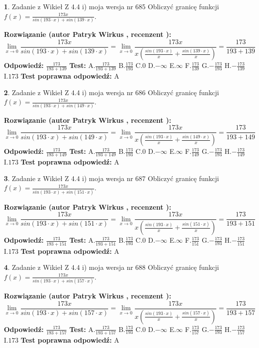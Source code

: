 \documentclass[12pt, a4paper]{article}
\theoremstyle{definition} %
\newtheorem{zad}{}
\newcommand{\zadStart}[1]{\begin{zad}#1\newline}
\newcommand{\zadStop}{\end{zad}}
\newcommand{\rozwStart}[2]{\noindent \textbf{Rozwiązanie (autor #1 , recenzent #2): }\newline}
\newcommand{\rozwStop}{\newline}
\newcommand{\odpStart}{\noindent \textbf{Odpowiedź:}\newline}
\newcommand{\odpStop}{\newline}
\newcommand{\testStart}{\noindent \textbf{Test:}\newline}
\newcommand{\testStop}{\newline}
\newcommand{\kluczStart}{\noindent \textbf{Test poprawna odpowiedź:}\newline}
\newcommand{\kluczStop}{\newline}
\begin{document}
\zadStart{Zadanie z Wikieł Z 4.4 i) moja wersja nr 685}
Obliczyć granicę funkcji $f(x)=\frac{173x}{sin(193\cdot x) +sin(139\cdot x)}$.
\zadStop
\rozwStart{Patryk Wirkus}{}
$$\lim\limits_{x\to 0}\frac{173x}{sin(193\cdot x) +sin(139\cdot x)}=\lim\limits_{x\to 0}\frac{173x}{x(\frac{sin(193\cdot x)}{x}+\frac{sin(139\cdot x)}{x})}=\frac{173}{193+139}$$
\rozwStop
\odpStart
$\frac{173}{193+139}$
\odpStop
\testStart
A.$\frac{173}{193+139}$
B.$\frac{173}{193}$
C.$0$
D.$-\infty$
E.$\infty$
F.$\frac{173}{139}$
G.$-\frac{173}{193}$
H.$-\frac{173}{139}$
I.$173$
\testStop
\kluczStart
A
\kluczStop



\zadStart{Zadanie z Wikieł Z 4.4 i) moja wersja nr 686}
Obliczyć granicę funkcji $f(x)=\frac{173x}{sin(193\cdot x) +sin(149\cdot x)}$.
\zadStop
\rozwStart{Patryk Wirkus}{}
$$\lim\limits_{x\to 0}\frac{173x}{sin(193\cdot x) +sin(149\cdot x)}=\lim\limits_{x\to 0}\frac{173x}{x(\frac{sin(193\cdot x)}{x}+\frac{sin(149\cdot x)}{x})}=\frac{173}{193+149}$$
\rozwStop
\odpStart
$\frac{173}{193+149}$
\odpStop
\testStart
A.$\frac{173}{193+149}$
B.$\frac{173}{193}$
C.$0$
D.$-\infty$
E.$\infty$
F.$\frac{173}{149}$
G.$-\frac{173}{193}$
H.$-\frac{173}{149}$
I.$173$
\testStop
\kluczStart
A
\kluczStop



\zadStart{Zadanie z Wikieł Z 4.4 i) moja wersja nr 687}
Obliczyć granicę funkcji $f(x)=\frac{173x}{sin(193\cdot x) +sin(151\cdot x)}$.
\zadStop
\rozwStart{Patryk Wirkus}{}
$$\lim\limits_{x\to 0}\frac{173x}{sin(193\cdot x) +sin(151\cdot x)}=\lim\limits_{x\to 0}\frac{173x}{x(\frac{sin(193\cdot x)}{x}+\frac{sin(151\cdot x)}{x})}=\frac{173}{193+151}$$
\rozwStop
\odpStart
$\frac{173}{193+151}$
\odpStop
\testStart
A.$\frac{173}{193+151}$
B.$\frac{173}{193}$
C.$0$
D.$-\infty$
E.$\infty$
F.$\frac{173}{151}$
G.$-\frac{173}{193}$
H.$-\frac{173}{151}$
I.$173$
\testStop
\kluczStart
A
\kluczStop



\zadStart{Zadanie z Wikieł Z 4.4 i) moja wersja nr 688}
Obliczyć granicę funkcji $f(x)=\frac{173x}{sin(193\cdot x) +sin(157\cdot x)}$.
\zadStop
\rozwStart{Patryk Wirkus}{}
$$\lim\limits_{x\to 0}\frac{173x}{sin(193\cdot x) +sin(157\cdot x)}=\lim\limits_{x\to 0}\frac{173x}{x(\frac{sin(193\cdot x)}{x}+\frac{sin(157\cdot x)}{x})}=\frac{173}{193+157}$$
\rozwStop
\odpStart
$\frac{173}{193+157}$
\odpStop
\testStart
A.$\frac{173}{193+157}$
B.$\frac{173}{193}$
C.$0$
D.$-\infty$
E.$\infty$
F.$\frac{173}{157}$
G.$-\frac{173}{193}$
H.$-\frac{173}{157}$
I.$173$
\testStop
\kluczStart
A
\kluczStop
\end{document}
